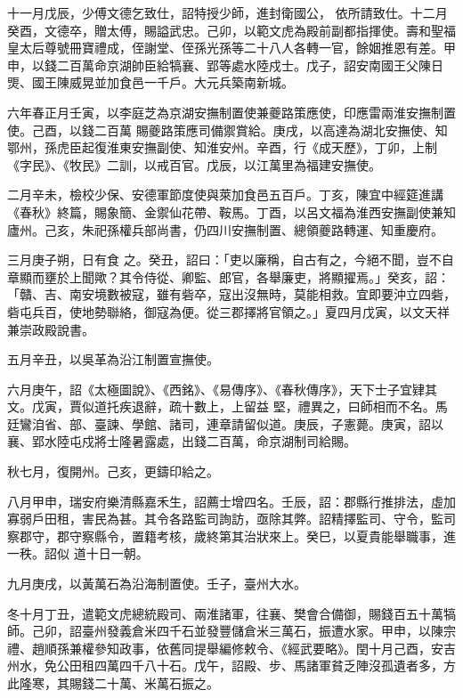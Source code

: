 \begin{pinyinscope}
 十一月戊辰，少傅文德乞致仕，詔特授少師，進封衛國公，
 依所請致仕。十二月癸酉，文德卒，贈太傅，賜謚武忠。己卯，以範文虎為殿前副都指揮使。壽和聖福皇太后尊號冊寶禮成，侄謝堂、侄孫光孫等二十八人各轉一官，餘姻推恩有差。甲申，以錢二百萬命京湖帥臣給犒襄、郢等處水陸戍士。戊子，詔安南國王父陳日煚、國王陳威晃並加食邑一千戶。大元兵築南新城。



 六年春正月壬寅，以李庭芝為京湖安撫制置使兼夔路策應使，印應雷兩淮安撫制置使。己酉，以錢二百萬
 賜夔路策應司備禦賞給。庚戌，以高達為湖北安撫使、知鄂州，孫虎臣起復淮東安撫副使、知淮安州。辛酉，行《成天歷》，丁卯，上制《字民》、《牧民》二訓，以戒百官。戊辰，以江萬里為福建安撫使。



 二月辛未，檢校少保、安德軍節度使與萊加食邑五百戶。丁亥，陳宜中經筵進講《春秋》終篇，賜象簡、金禦仙花帶、鞍馬。丁酉，以呂文福為淮西安撫副使兼知廬州。己亥，朱祀孫權兵部尚書，仍四川安撫制置、總領夔路轉運、知重慶府。



 三月庚子朔，日有食
 之。癸丑，詔曰：「吏以廉稱，自古有之，今絕不聞，豈不自章顯而壅於上聞歟？其令侍從、卿監、郎官，各舉廉吏，將顯擢焉。」癸亥，詔：「贛、吉、南安境數被寇，雖有砦卒，寇出沒無時，莫能相救。宜即要沖立四砦，砦屯兵百，使地勢聯絡，御寇為便。從三郡擇將官領之。」夏四月戊寅，以文天祥兼崇政殿說書。



 五月辛丑，以吳革為沿江制置宣撫使。



 六月庚午，詔《太極圖說》、《西銘》、《易傳序》、《春秋傳序》，天下士子宜肄其文。戊寅，賈似道托疾退辭，疏十數上，上留益
 堅，禮異之，曰師相而不名。馬廷鸞洎省、部、臺諫、學館、諸司，連章請留似道。庚辰，子憲薨。庚寅，詔以襄、郢水陸屯戍將士隆暑露處，出錢二百萬，命京湖制司給賜。



 秋七月，復開州。己亥，更鑄印給之。



 八月甲申，瑞安府樂清縣嘉禾生，詔薦士增四名。壬辰，詔：郡縣行推排法，虛加寡弱戶田租，害民為甚。其令各路監司詢訪，亟除其弊。詔精擇監司、守令，監司察郡守，郡守察縣令，置籍考核，歲終第其治狀來上。癸巳，以夏貴能舉職事，進一秩。詔似
 道十日一朝。



 九月庚戌，以黃萬石為沿海制置使。壬子，臺州大水。



 冬十月丁丑，遣範文虎總統殿司、兩淮諸軍，往襄、樊會合備御，賜錢百五十萬犒師。己卯，詔臺州發義倉米四千石並發豐儲倉米三萬石，振遭水家。甲申，以陳宗禮、趙順孫兼權參知政事，依舊同提舉編修敕令、《經武要略》。閏十月己酉，安吉州水，免公田租四萬四千八十石。戊午，詔殿、步、馬諸軍貧乏陣沒孤遺者多，方此隆寒，其賜錢二十萬、米萬石振之。




\end{pinyinscope}
